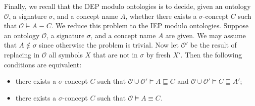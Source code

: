 \documentclass[10pt,a4paper]{amsart}
\theoremstyle{plain}
\theoremstyle{definition}
\newcommand{\bs}{\boldsymbol{\beta}}
\begin{document}
\begin{appendix}
Finally, we recall that the DEP modulo ontologies is to decide, given an ontology $\mathcal{O}$, a signature $\sigma$, and a concept name $A$, whether there exists a $\sigma$-concept $C$ such that $\mathcal{O}\models A \equiv C$. We reduce this problem to the IEP modulo ontologies.
Suppose an ontology $\mathcal{O}$, a signature $\sigma$, and a concept name $A$
are given. We may assume that $A\not\in\sigma$ since otherwise the problem is trivial.
Now let $\mathcal{O}'$ be the result of replacing in  $\mathcal{O}$ all symbols
$X$ that are not in $\sigma$ by fresh $X'$. Then the following conditions are equivalent:
%
\begin{itemize}
	\item[--] there exists a $\sigma$-concept $C$ such that $\mathcal{O}\cup \mathcal{O}'\models A \sqsubseteq C$ and $\mathcal{O}\cup \mathcal{O}'\models C \sqsubseteq A'$; 
	
	\item[--] there exists a $\sigma$-concept $C$ such that $\mathcal{O}\models A \equiv C$.
\end{itemize}



\end{appendix}
\end{document}
